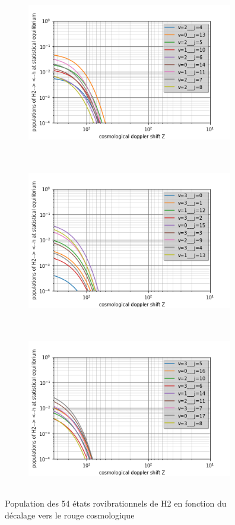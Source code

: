 \documentclass[10pt, a4paper]{report}
\numberwithin{equation}{subsection}
\begin{document}
\begin{figure}[]
\begin{subfigure}{0.5\textwidth}
\end{subfigure}
\begin{subfigure}{0.5\textwidth}
\centering
\includegraphics[width=9cm,height=7cm]{levelsh2-h.3.png}
\end{subfigure}
\begin{subfigure}{0.5\textwidth}
\centering
\includegraphics[width=9cm,height=7cm]{levelsh2-h.4.png}
\end{subfigure}
\begin{subfigure}{0.5\textwidth}
\centering
\includegraphics[width=9cm,height=7cm]{levelsh2-h.5.png}
\end{subfigure}

\caption{Population des 54 états rovibrationnels de H2 en fonction du décalage vers le rouge cosmologique}
\label{fig:POPH2}
\end{figure}
\end{document}
